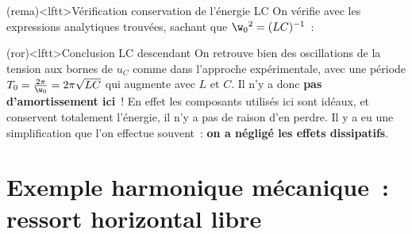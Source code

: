 \documentclass[../../main/main.tex]{subfiles}
\begin{document}
\begin{tcb}[label=impl](rema)<lftt>{Vérification conservation de l'énergie LC}
	On vérifie avec les expressions analytiques trouvées, sachant que
	$\w_0{}^2 = (LC)^{-1}$~:
  \vspace{-20pt}
\end{tcb}
\begin{tcb}[label=ror:amortissement](ror)<lftt>{Conclusion LC descendant}
	On retrouve bien des oscillations de la tension aux bornes de $u_C$ comme dans
	l'approche expérimentale, avec une période $T_0 = \frac{2\pi}{\w_0} =
		2\pi\sqrt{LC}$ qui augmente avec $L$ et $C$.
	\bigbreak
	Il n'y a donc \textbf{pas d'amortissement ici}~! En effet les composants
	utilisés ici sont idéaux, et conservent totalement l'énergie, il n'y a pas de
	raison d'en perdre.
	\bigbreak
	Il y a eu une simplification que l'on effectue souvent~:
	\textbf{on a négligé les effets dissipatifs}.
\end{tcb}

\section{Exemple harmonique mécanique~: ressort horizontal libre}
\end{document}
